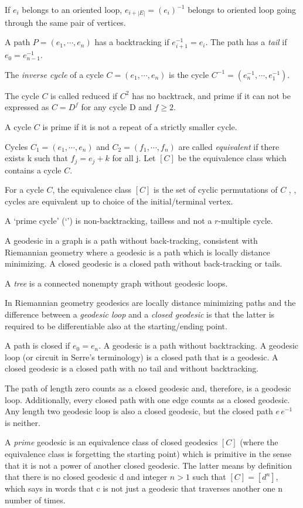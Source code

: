 \begin{description}
If $e_{i}$ belongs to an oriented loop,
$e_{i+|E|}=(e_{i})^{-1}$ belongs to oriented loop going
through the same pair of vertices.

A path $P=(e_1,\cdots,e_n)$ has a backtracking if $e_{i+1}^{-1}=e_i$.
The path has a \emph{tail} if $e_0 = e_{n-1}^{-1}$.

The \emph{inverse cycle} of a cycle $C=(e_1,\cdots,e_n)$ is the cycle
$C^{-1}=(e_n^{-1},\cdots,e_1^{-1})$.

The cycle $C$ is called reduced if \(C^2\) has no backtrack, and prime if
it can not be expressed as \(C=D^f\) for any cycle D and \(f\ge 2\).

A cycle $C$ is prime if it is not a repeat of a strictly smaller cycle.

Cycles $C_1=(e_1,\cdots,e_n)$ and $C_2=(f_1,\cdots,f_n)$ are called
\emph{equivalent} if there exists k such that $f_j=e_j+k$ for all j.
Let $[C]$ be the equivalence class which contains a cycle $C$.

For a cycle $C$, the equivalence class $[C]$  is the set of cyclic
permutations of $C$ , \ie, cycles are equivalent up to choice of the
initial/terminal vertex.

A `prime cycle' (`\orbit') is non-backtracking, tailless and not a $r$-multiple cycle.

A geodesic in a graph is a path without back-tracking, consistent with
Riemannian geometry where a geodesic is a path which is  locally distance
minimizing. A closed geodesic is a closed path without back-tracking or
tails.


A \emph{tree} is a connected nonempty graph without geodesic loops.

In Riemannian geometry geodesics are locally distance minimizing paths
and the difference between a \emph{geodesic loop} and a \emph{closed
geodesic} is that the latter is required to be differentiable also at the
starting/ending point.

A path is closed if $e_0=e_n$. A geodesic is a path without backtracking.
A geodesic loop (or circuit in Serre's terminology) is a closed path that
is a geodesic. A closed geodesic is a closed path with no tail and
without backtracking.

The path of length zero counts as a closed geodesic and, therefore, is a
geodesic loop. Additionally, every closed path with one edge counts as a
closed geodesic. Any length two geodesic loop is also a closed geodesic,
but the closed path $e\,e^{-1}$ is neither.

A \emph{prime} geodesic is an equivalence class of closed geodesics $[C]$
(where the equivalence class is forgetting the starting point) which is
primitive in the sense that it is not a power of another closed geodesic.
The latter means by definition that there is no closed geodesic d and
integer $n > 1$ such that $[C] = \left[d^n\right]$, which says in words
that c is not just a geodesic that traverses another one n number of
times.


\end{description}
